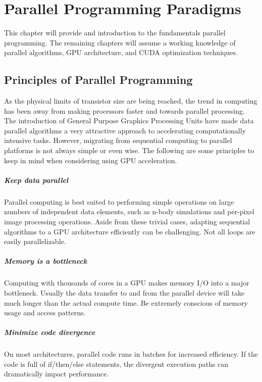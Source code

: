 \chapter{Parallel Programming Paradigms}
\label{chap:parallelprogramming}
This chapter will provide and introduction to the fundamentals parallel programming. The remaining chapters will assume a working knowledge of parallel algorithms, GPU architecture, and CUDA optimization techniques.
\section{Principles of Parallel Programming}
As the physical limits of transistor size are being reached, the trend in computing has been away from making processors faster and towards parallel processing. The introduction of General Purpose Graphics Processing Units have made data parallel algorithms a very attractive approach to accelerating computationally intensive tasks. However, migrating from sequential computing to parallel platforms is not always simple or even wise. The following are some principles to keep in mind when considering using GPU acceleration.\par
\paragraph{Keep data parallel} 
Parallel computing is best suited to performing simple operations on large numbers of independent data elements, such as n-body simulations and per-pixel image processing operations. Aside from these trivial cases, adapting sequential algorithms to a GPU architecture efficiently can be challenging. Not all loops are easily parallelizable.
\paragraph{Memory is a bottleneck}
Computing with thousands of cores in a GPU makes memory I/O into a major bottleneck. Usually the data transfer to and from the parallel device will take much longer than the actual compute time. Be extremely conscious of memory usage and access patterns.
\paragraph{Minimize code divergence}
On most architectures, parallel code runs in batches for increased efficiency. If the code is full of if/then/else statements, the divergent execution paths can dramatically impact performance.
